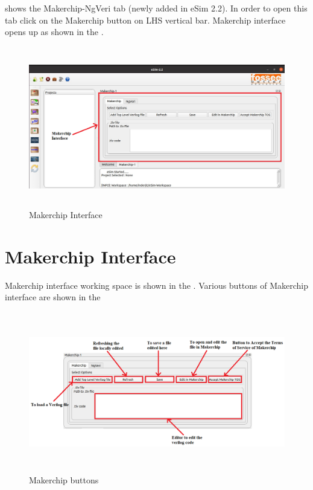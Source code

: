  shows the Makerchip-NgVeri tab (newly added in eSim 2.2). In order to open this tab click on the Makerchip button on LHS vertical bar. Makerchip interface opens up as shown in the . 

\begin{figure}[H]
\centering
\includegraphics[width = 14cm, height = 7cm]{./NgVeri/makerchipinterface.png}
\caption{Makerchip Interface}
\label{makerchipinterface}
\end{figure}

\pagebreak

\section{Makerchip Interface}

Makerchip interface working space is shown in the . Various buttons of Makerchip interface are shown in the 

\begin{figure}[H]
\centering
\includegraphics[width = 14cm, height = 7cm]{./NgVeri/makerchipbuttons.png}
\caption{Makerchip buttons}
\label{makerchipbuttons}
\end{figure}

